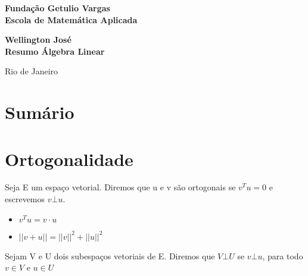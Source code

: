 \documentclass[12pt]{article}
\begin{document}
\begin{titlepage}
\begin{center}
\textbf{\LARGE Fundação Getulio Vargas}\\ 
\textbf{\LARGE Escola de Matemática Aplicada}

\par
\vspace{170pt}
\textbf{\Large Wellington José}\\
\vspace{32pt}
\textbf{\Large Resumo Álgebra Linear}\\
\end{center}

\par
\vfill
\begin{center}
{{\normalsize Rio de Janeiro}\\
{\normalsize \the\year}}
\end{center}
\end{titlepage}

\thispagestyle{empty}

\section*{Sumário}

\hspace{6mm}\textbf{}
\vspace{4mm}

\textbf{}
\vspace{4mm}

\textbf{}
\vspace{4mm}

\textbf{}
\vspace{4mm}

\textbf{}

\newpage

\section*{Ortogonalidade}
\label{s1}
    Seja E um espaço vetorial. Diremos que u e v são ortogonais se $v^Tu = 0$ e escrevemos $v \bot u$.
    \begin{itemize}
        \item $v^T u = v \cdot u$
        \item $||v + u|| = ||v||^2 + ||u||^2$
    \end{itemize}
    Sejam V e U dois subespaços vetoriais de E. Diremos que $V \bot U$ se $v \bot u$, para todo $v \in V$ e $u \in U$
    
\end{document}
